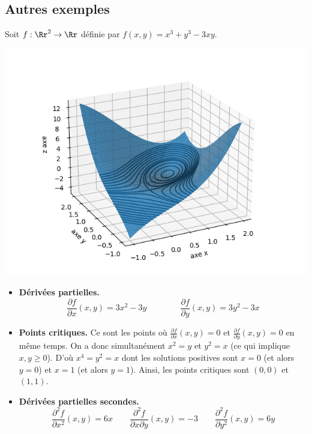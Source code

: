 \subsection{Autres exemples}

\begin{exemple}{}{}
Soit $f: \Rr^2 \to \Rr$ définie par $f(x,y)=x^3+y^3-3xy$.


\begin{center}
\includegraphics[scale=\myscale,scale=0.8]{figures/fonctions-extrem-4}
\end{center}

	

\begin{itemize}
	\item \textbf{Dérivées partielles.}
    $$\frac{\partial f}{\partial x}(x,y) = 3x^2-3y \qquad\qquad
    \frac{\partial f}{\partial y}(x,y) = 3y^2-3x$$
    	
	\item \textbf{Points critiques.}
    Ce sont les points où $\frac{\partial f}{\partial x}(x,y) = 0$ et $\frac{\partial f}{\partial y}(x,y) = 0$ en même temps. On a donc simultanément $x^2=y$ et $y^2=x$ (ce qui implique $x,y\ge0$).
    D'où $x^4 = y^2 = x$ dont les solutions positives sont $x=0$ (et alors $y=0$) et $x=1$ (et alors $y=1$). Ainsi, les points critiques sont $(0,0)$ et $(1,1)$.
	
	\item \textbf{Dérivées partielles secondes.}
    $$\frac{\partial^2 f}{\partial x^2}(x,y) = 6x
    \qquad 
    \frac{\partial^2 f}{\partial x \partial y}(x,y) = -3
    \qquad
    \frac{\partial^2 f}{\partial y^2}(x,y) = 6y$$
	

\end{itemize}
\end{exemple}
